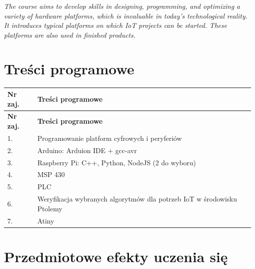 \documentclass[12pt, a4paper]{article}
\newcommand{\thdrule}{\noalign{\global\setlength{\extrarowheight}{0pt}}}
\newcommand{\thdend}{\noalign{\global\setlength{\extrarowheight}{3pt}}}
\begin{document}
\textit{The course aims to develop skills in designing, programming, and optimizing a variety of hardware platforms, which is invaluable in today’s technological reality. It introduces typical platforms on which IoT projects can be started. These platforms are also used in finished products.}


\section{Treści programowe}

{\scriptsize
\begin{longtable}{m{1.5cm}m{14.5cm}}
\thdrule\toprule
\rowcolor{pjatkRed} {\color{white}\textbf{Nr zaj.}} & {\color{white}\textbf{Treści programowe}} \\
\midrule\thdend
\endfirsthead
\thdrule\toprule
\rowcolor{pjatkRed} {\color{white}\textbf{Nr zaj.}} & {\color{white}\textbf{Treści programowe}} \\
\midrule\thdend
\endhead
  \rowcolor{tableRowLight} 1. & Programowanie platform cyfrowych i peryferiów \\
  \rowcolor{tableRowAlt} 2. & Arduino: Arduion IDE + gcc-avr \\
  \rowcolor{tableRowLight} 3. & Raspberry Pi: C++, Python, NodeJS (2 do wyboru) \\
  \rowcolor{tableRowAlt} 4. & MSP 430 \\
  \rowcolor{tableRowLight} 5. & PLC \\
  \rowcolor{tableRowAlt} 6. & Weryfikacja wybranych algorytmów dla potrzeb IoT w środowisku Ptolemy \\
  \rowcolor{tableRowLight} 7. & Atiny \\
\bottomrule
\end{longtable}}

\section{Przedmiotowe efekty uczenia się}
\end{document}
